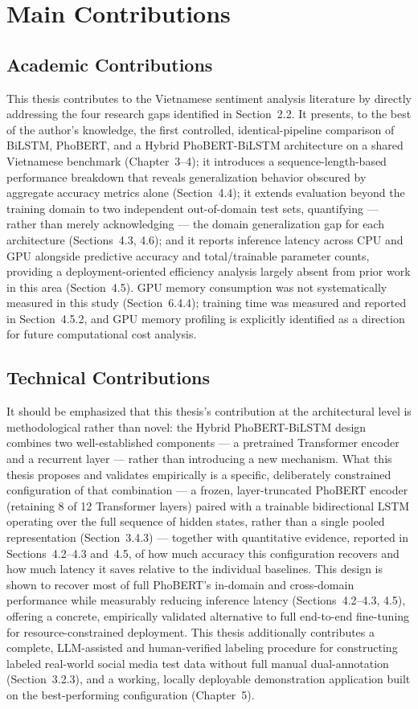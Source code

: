 \documentclass[12pt]{report} %
\begin{document}
\section{Main Contributions}

\subsection{Academic Contributions}
This thesis contributes to the Vietnamese sentiment analysis literature by directly addressing the four research gaps identified in Section~2.2. It presents, to the best of the author's knowledge, the first controlled, identical-pipeline comparison of BiLSTM, PhoBERT, and a Hybrid PhoBERT-BiLSTM architecture on a shared Vietnamese benchmark (Chapter~3--4); it introduces a sequence-length-based performance breakdown that reveals generalization behavior obscured by aggregate accuracy metrics alone (Section~4.4); it extends evaluation beyond the training domain to two independent out-of-domain test sets, quantifying --- rather than merely acknowledging --- the domain generalization gap for each architecture (Sections~4.3, 4.6); and it reports inference latency across CPU and GPU alongside predictive accuracy and total/trainable parameter counts, providing a deployment-oriented efficiency analysis largely absent from prior work in this area (Section~4.5). GPU memory consumption was not systematically measured in this study (Section~6.4.4); training time was measured and reported in Section~4.5.2, and GPU memory profiling is explicitly identified as a direction for future computational cost analysis.


\subsection{Technical Contributions}
It should be emphasized that this thesis's contribution at the architectural level is methodological rather than novel: the Hybrid PhoBERT-BiLSTM design combines two well-established components --- a pretrained Transformer encoder and a recurrent layer --- rather than introducing a new mechanism. What this thesis proposes and validates empirically is a specific, deliberately constrained configuration of that combination --- a frozen, layer-truncated PhoBERT encoder (retaining 8 of 12 Transformer layers) paired with a trainable bidirectional LSTM operating over the full sequence of hidden states, rather than a single pooled representation (Section~3.4.3) --- together with quantitative evidence, reported in Sections~4.2--4.3 and~4.5, of how much accuracy this configuration recovers and how much latency it saves relative to the individual baselines. This design is shown to recover most of full PhoBERT's in-domain and cross-domain performance while measurably reducing inference latency (Sections~4.2--4.3, 4.5), offering a concrete, empirically validated alternative to full end-to-end fine-tuning for resource-constrained deployment. This thesis additionally contributes a complete, LLM-assisted and human-verified labeling procedure for constructing labeled real-world social media test data without full manual dual-annotation (Section~3.2.3), and a working, locally deployable demonstration application built on the best-performing configuration (Chapter~5).
\end{document}
